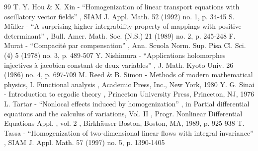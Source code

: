 \documentclass[11pt]{article}
\theoremstyle{plain}
\theoremstyle{definition}
\numberwithin{equation}{section}
\begin{document}
\begin{thebibliography}{99}
 T. Y. Hou \& X. Xin - “Homogenization of linear transport equations with oscillatory vector fields” , SIAM J. Appl. Math. 52 (1992) no. 1, p. 34-45
 S. Müller - “A surprising higher integrability property of mappings with positive determinant” , Bull. Amer. Math. Soc. (N.S.) 21 (1989) no. 2, p. 245-248
 F. Murat - “Compacité par compensation” , Ann. Scuola Norm. Sup. Pisa Cl. Sci. (4) 5 (1978) no. 3, p. 489-507
 Y. Nishimura - “Applications holomorphes injectives à jacobien constant de deux variables” , J. Math. Kyoto Univ. 26 (1986) no. 4, p. 697-709
 M. Reed \& B. Simon - Methods of modern mathematical physics, I. Functional analysis , Academic Press, Inc., New York, 1980
 Y. G. Sinai - Introduction to ergodic theory , Princeton University Press, Princeton, NJ, 1976
 L. Tartar - “Nonlocal effects induced by homogenization” , in Partial differential equations and the calculus of variations, Vol. II , Progr. Nonlinear Differential Equations Appl. , vol. 2 , Birkhäuser Boston, Boston, MA, 1989, p. 925-938
 T. Tassa - “Homogenization of two-dimensional linear flows with integral invariance” , SIAM J. Appl. Math. 57 (1997) no. 5, p. 1390-1405
\end{thebibliography}
\end{document}
